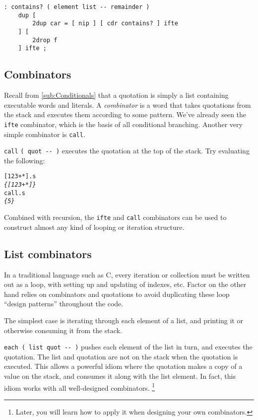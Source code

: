 \documentclass[english]{article}
\begin{document}
\begin{verbatim}
: contains? ( element list -- remainder )
    dup [
        2dup car = [ nip ] [ cdr contains? ] ifte
    ] [
        2drop f
    ] ifte ;
\end{verbatim}

\subsection{Combinators}

Recall from \ref{sub:Conditionals} that a quotation is simply a list containing executable words and literals. A \emph{combinator} is a word that takes quotations from the stack and executes them according to some pattern. We've already seen the \texttt{ifte} combinator, which is the basis of all conditional branching. Another very simple combinator is \texttt{call}.

\texttt{call} \texttt{( quot -{}- )} executes the quotation at the
top of the stack. Try evaluating the following:

\begin{alltt}
{[} 1 2 3 + {*} {]} .s
\emph{\{ {[} 1 2 3 + {*} {]} \}}
call .s
\emph{\{ 5 \}}
\end{alltt}

Combined with recursion, the \texttt{ifte} and \texttt{call} combinators can be used to construct almost any kind of looping or iteration structure.

\subsection{List combinators}

In a traditional language such as C, every iteration or collection
must be written out as a loop, with setting up and updating of indexes,
etc. Factor on the other hand relies on combinators and quotations
to avoid duplicating these loop ``design patterns'' throughout
the code.

The simplest case is iterating through each element of a list, and
printing it or otherwise consuming it from the stack.

\texttt{each ( list quot -{}- )} pushes each element of the list in
turn, and executes the quotation. The list and quotation are not on
the stack when the quotation is executed. This allows a powerful idiom
where the quotation makes a copy of a value on the stack, and consumes
it along with the list element. In fact, this idiom works with all
well-designed combinators.%
\footnote{Later, you will learn how to apply it when designing your own combinators.%
}
\end{document}
